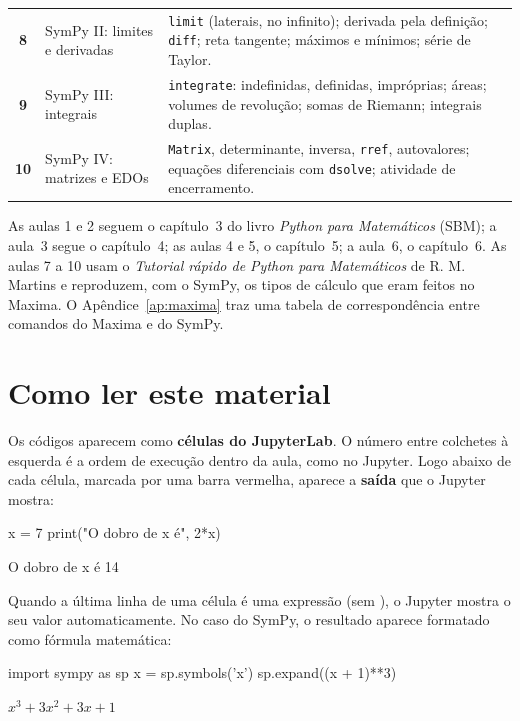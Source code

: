 \begin{center}
\begin{tabularx}{\linewidth}{@{}>{\sffamily\bfseries}c >{\raggedright\arraybackslash}p{4.2cm} X @{}}
8 & SymPy II: limites e derivadas & \texttt{limit} (laterais, no infinito); derivada pela definição; \texttt{diff}; reta tangente; máximos e mínimos; série de Taylor.\\
9 & SymPy III: integrais & \texttt{integrate}: indefinidas, definidas, impróprias; áreas; volumes de revolução; somas de Riemann; integrais duplas.\\
10 & SymPy IV: matrizes e EDOs & \texttt{Matrix}, determinante, inversa, \texttt{rref}, autovalores; equações diferenciais com \texttt{dsolve}; atividade de encerramento.\\
\bottomrule
\end{tabularx}
\end{center}

As aulas 1 e 2 seguem o capítulo~3 do livro \emph{Python para Matemáticos} (SBM); a aula~3 segue o capítulo~4;
as aulas 4 e 5, o capítulo~5; a aula~6, o capítulo~6. As aulas 7 a 10 usam o \emph{Tutorial rápido de Python para
Matemáticos} de R. M. Martins e reproduzem, com o SymPy, os tipos de cálculo que eram feitos no Maxima.
O Apêndice~\ref{ap:maxima} traz uma tabela de correspondência entre comandos do Maxima e do SymPy.

\section*{Como ler este material}

Os códigos aparecem como \textbf{células do JupyterLab}. O número entre colchetes à esquerda é a ordem de execução
dentro da aula, como no Jupyter. Logo abaixo de cada célula, marcada por uma barra vermelha, aparece a \textbf{saída}
que o Jupyter mostra:

\begin{entrada}
x = 7
print("O dobro de x é", 2*x)
\end{entrada}
\begin{saida}
O dobro de x é 14
\end{saida}

Quando a última linha de uma célula é uma expressão (sem ), o Jupyter mostra o seu valor automaticamente.
No caso do SymPy, o resultado aparece formatado como fórmula matemática:

\begin{entrada}
import sympy as sp
x = sp.symbols('x')
sp.expand((x + 1)**3)
\end{entrada}
\begin{saidamat}
$x^{3} + 3 x^{2} + 3 x + 1$
\end{saidamat}

